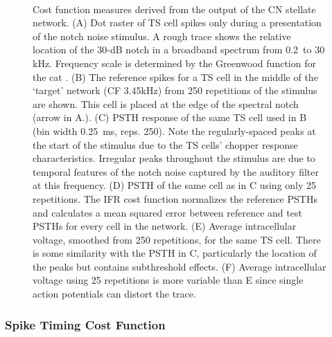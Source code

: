\begin{figure}[pt!]
  \begin{center}
    \\
    \vspace{0.1in}
\end{center}
\caption{Cost function measures derived from the output of the CN
  stellate network. (A) Dot raster of TS cell spikes only during a
  presentation of the notch noise stimulus. A rough trace shows the
  relative location of the 30-dB notch in a broadband spectrum from
  0.2~to 30 kHz. Frequency scale is determined by the Greenwood
  function for the cat \cite{Greenwood:1990}. (B) The reference spikes
  for a TS cell in the middle of the `target' network (CF 3.45kHz)
  from 250 repetitions of the stimulus are shown. This cell is placed
  at the edge of the spectral notch (arrow in A.). (C) PSTH response
  of the same TS cell used in B (bin width 0.25~ms, reps. 250). Note
  the regularly-spaced peaks at the start of the stimulus due to the
  TS cells' chopper response characteristics. Irregular peaks
  throughout the stimulus are due to temporal features of the notch
  noise captured by the auditory filter at this frequency. (D) PSTH of
  the same cell as in C using only 25 repetitions. The IFR cost
  function normalizes the reference PSTHs and calculates a mean
  squared error between reference and test PSTHs for every cell in the
  network. (E) Average intracellular voltage, smoothed from 250
  repetitions, for the same TS cell. There is some similarity with the
  PSTH in C, particularly the location of the peaks but contains
  subthreshold effects. (F) Average intracellular voltage using 25
  repetitions is more variable than E since single action potentials
  can distort the trace.}
\label{fig:GA:Costfunctions}
\end{figure}
\clearpage

\subsubsection{Spike Timing Cost Function}\label{sec:GA:spike-timing-cost-fn}


